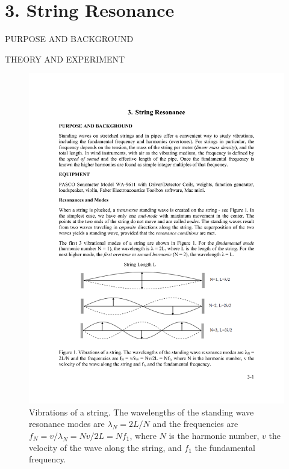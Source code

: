 \documentclass[11pt]{NSF}
\begin{document}
     
\section{3. String Resonance}

PURPOSE AND BACKGROUND

THEORY AND EXPERIMENT

%
\begin{figure}[hbtp]
\begin{center}
\includegraphics[width=.85\textwidth]{fig3_1}
\caption{Vibrations of a string. The wavelengths of the standing wave resonance
modes are $\lambda_N = 2L/N$ and the frequencies are 
$f_N = v/\lambda_N = Nv/2L = N f_1$, where $N$ is
the harmonic number, $v$ the velocity of the wave along the string,
and $f_1$ the fundamental frequency.} 
\label{f:1} 
\end{center} 
\end{figure}
%
%
\end{document}
